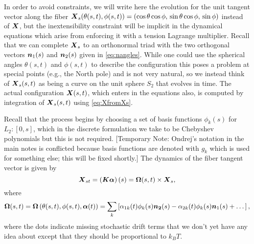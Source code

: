 In order to avoid constraints, we will write here the evolution for the unit tangent vector along the fiber $\boldsymbol{X}_s(\theta(s,t),\phi(s,t)) = \left( \cos{\theta} \cos{\phi},\, \sin{\theta} \cos{\phi},\,  \sin{\phi} \right)$ instead of $\boldsymbol{X}$, but the inextensibility constraint will be implicit in the dynamical equations which arise from enforcing it with a tension Lagrange multiplier. Recall that we can complete $\boldsymbol{X}_s$ to an orthonormal triad with the two orthogonal vectors $\boldsymbol{n}_1(s)$ and $\boldsymbol{n}_2(s)$ given in \eqref{eq:nangles}. While one could use the spherical angles $\theta(s,t)$ and $\phi(s,t)$ to describe the configuration this poses a problem at special points (e.g., the North pole) and is not very natural, so we instead think of $\boldsymbol{X}_s(s,t)$ as being a curve on the unit sphere $S_2$ that evolves in time. The actual configuration $\boldsymbol{X}(s,t)$, which enters in the equations also, is computed by integration of $\boldsymbol{X}_s(s,t)$ using \eqref{eq:XfromXs}.

Recall that the process begins by choosing a set of basis functions $\phi_k(s)$ for $L_2:[0,s]$, which in the discrete formulation we take to be Chebyshev polynomials but this is not required. [Temporary Note: Ondrej's notation in the main notes is conflicted because basis functions are denoted with $g_k$ which is used for something else; this will be fixed shortly.] The dynamics of the fiber tangent vector is given by
\begin{equation}
\label{eq:Xsupdate_fluct}
\boldsymbol{X}_{st} = \left( \boldsymbol{K} \boldsymbol{\alpha}\right)(s) = \boldsymbol{\Omega}(s,t) \times \boldsymbol{X}_s, 
\end{equation}
where
\begin{equation}
\label{eq:Omega_fluct}
\boldsymbol{\Omega}(s,t) = \boldsymbol{\Omega}\left(\theta(s,t),\phi(s,t), \boldsymbol{\alpha}(t)\right) = 
	\sum_k \left[ \alpha_{1k}(t) \phi_k(s) \boldsymbol{n_2}(s) - \alpha_{2k}(t) \phi_k(s) \boldsymbol{n}_1(s) + \dots \right],
\end{equation}
where the dots indicate missing stochastic drift terms that we don't yet have any idea about except that they should be proportional to $k_B T$.

